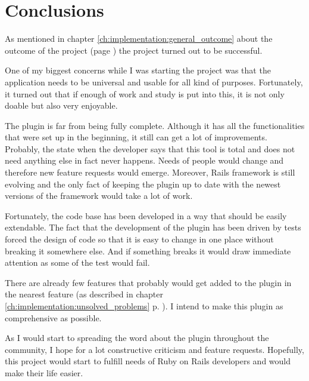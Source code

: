 \chapter{Conclusions}
  As mentioned in chapter \ref{ch:implementation:general_outcome} about the outcome of the project 
  (page \pageref{ch:implementation:general_outcome}) the project turned out to be successful.
  
  One of my biggest concerns while I was starting the project was
  that the application needs to be universal and 
  usable for all kind of purposes. Fortunately, it turned out that if enough of
  work and study is put into this, it is not only doable but also very enjoyable.
  
  The plugin is far from being fully complete. Although it has all the functionalities
  that were set up in the beginning, it still can get a lot of improvements. 
  Probably, the state when the developer says that this tool is total and does not
  need anything else in fact never happens. Needs of people would change and therefore
  new feature requests would emerge. Moreover, Rails framework is still evolving
  and the only fact of keeping the plugin up to date with the newest 
  versions of the framework would take a lot of work.
  
  Fortunately, the code base has been developed in a way
  that should be easily extendable. The fact that the development of the
  plugin has been driven by tests forced the design of code so that it 
  is easy to change in one place without breaking it somewhere else. 
  And if something breaks it would draw immediate attention as some
  of the test would fail.
  
  There are already few features
  that probably would get added to the plugin in the nearest feature 
  (as described in chapter \ref{ch:implementation:unsolved_problems} p. 
  \pageref{ch:implementation:unsolved_problems}). I intend to make 
  this plugin as comprehensive as possible. 
  
  As I would start to spreading the word about the plugin throughout the community,
  I hope for a lot constructive criticism and feature requests. Hopefully, this project
  would start to fulfill needs of Ruby on Rails developers and would make their life 
  easier.
    
  